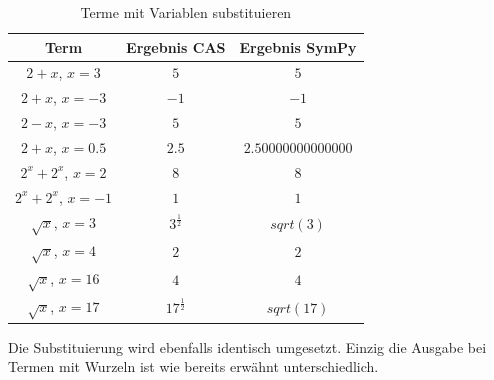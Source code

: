 \documentclass[11pt,a4paper, ngerman]{article}
\begin{document}
\begin{table}[h!]
    \caption{Terme mit Variablen substituieren}
    \centering
    \begin{tabular}{|c|c|c|}
        \hline
        \textbf{Term} & \textbf{Ergebnis CAS} & \textbf{Ergebnis SymPy} \\
        \hline
        $2+x$, $x=3$ & $5$ & $5$ \\
        \hline
        $2+x$, $x=-3$ & $-1$ & $-1$ \\
        \hline
        $2-x$, $x=-3$ & $5$ & $5$ \\
        \hline
        $2+x$, $x=0.5$ & $2.5$ & $2.50000000000000$ \\
        \hline
        $2^{x} + 2^{x}$, $x=2$ & $8$ & $8$ \\
        \hline
        $2^{x} + 2^{x}$, $x=-1$ & $1$ & $1$ \\
        \hline
        $\sqrt{x}$, $x=3$ & $3^{\frac{1}{2}}$ & $sqrt(3)$ \\
        \hline
        $\sqrt{x}$, $x=4$ & $2$ & $2$ \\
        \hline
        $\sqrt{x}$, $x=16$ & $4$ & $4$ \\
        \hline
        $\sqrt{x}$, $x=17$ & $17^{\frac{1}{2}}$ & $sqrt(17)$ \\
        \hline
    \end{tabular}
\end{table}

Die Substituierung wird ebenfalls identisch umgesetzt. Einzig die Ausgabe bei Termen mit Wurzeln ist wie bereits erwähnt unterschiedlich.
\end{document}
